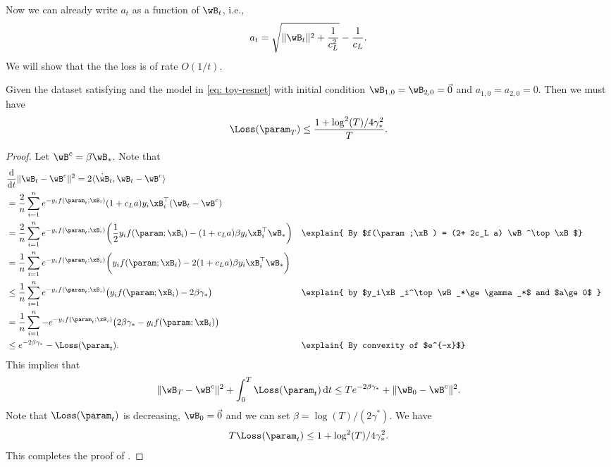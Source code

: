 Now we can already write $a_t$ as a function of $\wB_t$, i.e., 
\[
    a_t = \sqrt{\| \wB_t\|^2 + \frac{1}{c_L^2}} - \frac{1}{c_L}. 
\]
We will show that the the loss is of rate $O(1/t)$.  


\begin{lemma}
\label{lem: toy model loss upper bound}   
Given the dataset satisfying  and the model in \eqref{eq: toy-resnet} with initial condition  $\wB_{1,0} = \wB_{2,0} = \vec 0$ and $a_{1,0} = a_{2,0} = 0$. Then we must have 
\[
    \Loss (\param_T) \le \frac{1+ \log^2 (T) / 4 \gamma_*^2}{T}. 
\]
\end{lemma}
\begin{proof}
Let $\wB^c = \beta \wB_*$. Note that 
\begin{align*}
    &\lefteqn{\frac{\mathrm{d} }{\mathrm{d}  t} \| \wB_t - \wB^c\|^2 
    =  2 \langle \dot \wB_t, \wB_t - \wB^c \rangle }\\ 
    &=  \frac{2}{n} \sum_{i=1}^n e^{-y_i f(\param_t;\xB_i)} (1+ c_L a)y_i \xB_i^\top (\wB_t - \wB^c) \\ 
    & = \frac{2}{n} \sum_{i=1}^n e^{-y_i f(\param_t;\xB_i)} \bigg( \frac{1}{2} y_i f(\param;\xB_i) -  (1+c_L a) \beta y_i \xB_i^\top \wB_* \bigg) &&\explain{ By $f(\param;\xB) = (2+ 2c_L a) \wB^\top \xB$}\\ 
    & = \frac{1}{n}\sum_{i=1}^n e^{-y_i f(\param_t;\xB_i)} \bigg(  y_i f(\param;\xB_i) -  2(1+c_L a) \beta y_i \xB_i^\top \wB_* \bigg) \\ 
    & \le \frac{1}{n}\sum_{i=1}^n e^{-y_i f(\param_t;\xB_i)} \big(  y_i f(\param;\xB_i) -  2\beta \gamma_* \big) &&\explain{ by $y_i\xB_i^\top \wB_*\ge \gamma_*$ and $a\ge 0$ } \\ 
    & = \frac{1}{n}\sum_{i=1}^n -e^{-y_i f(\param_t;\xB_i)} \big(   2\beta \gamma_* - y_i f(\param;\xB_i)  \big) \\ 
    & \le e^{-2\beta \gamma_*} - \Loss (\param_t).  &&\explain{ By convexity of  $e^{-x}$}
\end{align*}
This implies that 
\[
    \|\wB_{T} - \wB^c\|^2 + \int_0^T \Loss (\param_t)\, \mathrm{d}  t \le T e^{-2\beta \gamma_*}  + \|\wB_0 - \wB^c\|^2.  
\]
Note that $\Loss (\param_t)$ is decreasing, $\wB_0 = \vec 0$ and we can set $\beta = \log (T) / (2\gamma^*)$. We have 
\[
    T \Loss(\param_t) \le 1  + \log^2 (T) / 4 \gamma_*^2.
\]
This completes the proof of .
\end{proof}
